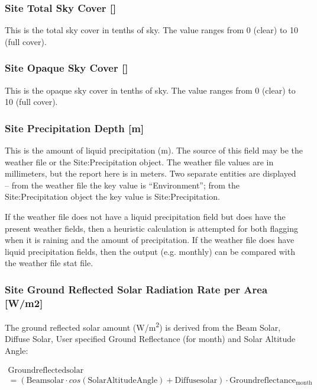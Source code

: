 \subsubsection{Site Total Sky Cover {[]}}\label{site-total-sky-cover}

This is the total sky cover in tenths of sky. The value ranges from 0 (clear) to 10 (full cover).

\subsubsection{Site Opaque Sky Cover {[]}}\label{site-opaque-sky-cover}

This is the opaque sky cover in tenths of sky. The value ranges from 0 (clear) to 10 (full cover).

\subsubsection{Site Precipitation Depth {[}m{]}}\label{site-precipitation-depth-m}

This is the amount of liquid precipitation (m). The source of this field may be the weather file or the Site:Precipitation object. The weather file values are in millimeters, but the report here is in meters. Two separate entities are displayed -- from the weather file the key value is ``Environment''; from the Site:Precipitation object the key value is Site:Precipitation.

If the weather file does not have a liquid precipitation field but does have the present weather fields, then a heuristic calculation is attempted for both flagging when it is raining and the amount of precipitation. If the weather file does have liquid precipitation fields, then the output (e.g. monthly) can be compared with the weather file stat file.

\subsubsection{Site Ground Reflected Solar Radiation Rate per Area {[}W/m2{]}}\label{site-ground-reflected-solar-radiation-rate-per-area-wm2}

The ground reflected solar amount (\si{W/m^2}) is derived from the Beam Solar, Diffuse Solar, User specified Ground Reflectance (for month) and Solar Altitude Angle:

\begin{multline}
  \mathrm{Groundreflectedsolar}
  \\
  = \left( \mathrm{Beamsolar} \cdot cos \left( \mathrm{SolarAltitudeAngle} \right) + \mathrm{Diffusesolar} \right) \cdot \mathrm{Groundreflectance}_{\mathrm{month}}
\end{multline}

